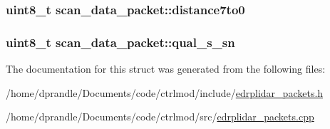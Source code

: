 \hypertarget{structscan__data__packet_a1622768a34e474d4ea482bd8ad27849f}{
\subsubsection[{distance7to0}]{\setlength{\rightskip}{0pt plus 5cm}uint8\-\_\-t scan\-\_\-data\-\_\-packet\-::distance7to0}}\label{structscan__data__packet_a1622768a34e474d4ea482bd8ad27849f}
\hypertarget{structscan__data__packet_af592db980953da3509611b9d5176cd8e}{
\subsubsection[{qual\-\_\-s\-\_\-sn}]{\setlength{\rightskip}{0pt plus 5cm}uint8\-\_\-t scan\-\_\-data\-\_\-packet\-::qual\-\_\-s\-\_\-sn}}\label{structscan__data__packet_af592db980953da3509611b9d5176cd8e}


The documentation for this struct was generated from the following files\-:\begin{DoxyCompactItemize}
\item 
/home/dprandle/\-Documents/code/ctrlmod/include/\hyperlink{edrplidar__packets_8h}{edrplidar\-\_\-packets.\-h}\item 
/home/dprandle/\-Documents/code/ctrlmod/src/\hyperlink{edrplidar__packets_8cpp}{edrplidar\-\_\-packets.\-cpp}\end{DoxyCompactItemize}
